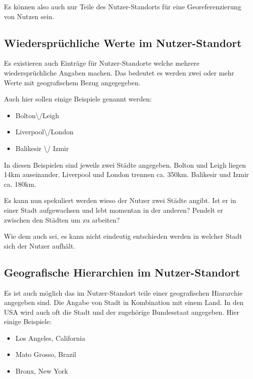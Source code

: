 			Es können also auch nur Teile des Nutzer-Standorts für eine Georeferenzierung von Nutzen sein.


		\subsection*{Wiedersprüchliche Werte im Nutzer-Standort} \label{subsec:wiederspruechlicheBezuege} 

			Es existieren auch Einträge für Nutzer-Standorte welche mehrere wiedersprüchliche Angaben machen.
			Das bedeutet es werden zwei oder mehr Werte mit geografischem Bezug angegegeben.

			Auch hier sollen einige Beispiele genannt werden:

			\begin{itemize}
				\item Bolton\textbackslash/Leigh
				\item Liverpool\textbackslash/London
				\item  Balikesir \textbackslash/ Izmir	
			\end{itemize}							
				
			In diesen Beispielen sind jeweils zwei Städte angegeben.
			Bolton und Leigh liegen 14km auseinander.
			Liverpool und London trennen ca. 350km.
			Balikesir und Izmir ca. 180km.

			Es kann nun spekuliert werden wieso der Nutzer zwei Städte angibt.
			Ist er in einer Stadt aufgewachsen und lebt momentan in der anderen?
			Pendelt er zwischen den Städten um zu arbeiten?

			Wie dem auch sei, es kann nicht eindeutig entschieden werden in welcher Stadt sich der Nutzer aufhält.


		\subsection*{Geografische Hierarchien im Nutzer-Standort}

			Es ist auch möglich das im Nutzer-Standort teile einer geografischen Hiararchie angegeben sind.
			Die Angabe von Stadt in Kombination mit einem Land.
			In den USA wird auch oft die Stadt und der zugehörige Bundesstaat angegeben.
			Hier einige Beispiele:

			\begin{itemize}
				\item Los Angeles, California
				\item Mato Grosso, Brazil
				\item Bronx, New York	
			\end{itemize}		

